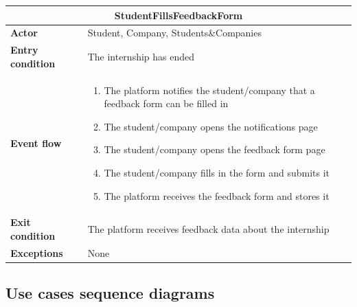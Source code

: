 \begin{enumerate}[label=\textbf{UC\arabic* -}]
\begin{table}[H]
    \centering
    \begin{tabular}{|l|m{10cm}|}
        \hline \multicolumn{2}{|c|}{\textbf{StudentFillsFeedbackForm}} \\
        \hline \textbf{Actor} & Student, Company, Students\&Companies \\
        \hline \textbf{Entry condition} & The internship has ended \\
        \hline \textbf{Event flow} &
            \begin{enumerate}[label=\arabic*]
                \item The platform notifies the student/company that a feedback form can be filled in
                \item The student/company opens the notifications page
                \item The student/company opens the feedback form page
                \item The student/company fills in the form and submits it
                \item The platform receives the feedback form and stores it
            \end{enumerate} \\
        \hline \textbf{Exit condition} & The platform receives feedback data about the internship \\
        \hline \textbf{Exceptions} & None \\
        \hline
    \end{tabular}
\end{table}

\end{enumerate}

\subsection{Use cases sequence diagrams}

